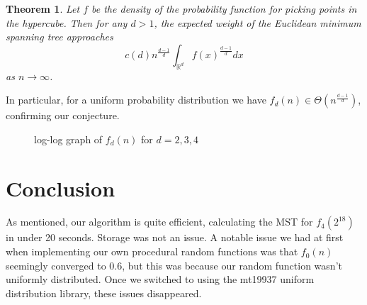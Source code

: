 \documentclass[a4paper, 10pt, twocolumn, twoside]{article}
\newtheorem{theorem}{Theorem}
\begin{document}
\begin{theorem}
    Let $f$ be the density of the probability function for picking points in the hypercube. Then for any $d>1$, the expected weight of the Euclidean minimum spanning tree approaches 
    \[
        c(d)n^{\frac{d-1}{d}}\int_{\mathbb{R}^d}f(x)^{\frac{d-1}{d}}dx
    \] 
    as $n\to \infty$. 
\end{theorem}

In particular, for a uniform probability distribution we have $f_d(n)\in \Theta(n^{\frac{d-1}{d}})$, confirming our conjecture.



\begin{figure}[htbp]
        \caption{log-log graph of $f_d(n)$ for $d=2,3,4$}
    \label{fig}
\end{figure}

\section{Conclusion}
\label{sec:Conclusion}

As mentioned, our algorithm is quite efficient, calculating the MST for $f_4(2^{18})$ in under 20 seconds. Storage was not an issue. A notable issue we had at first when implementing our own procedural random functions was that $f_0(n)$ seemingly converged to $0.6$, but this was because our random function wasn't uniformly distributed. Once we switched to using the mt19937 uniform distribution library, these issues disappeared.


\end{document}
